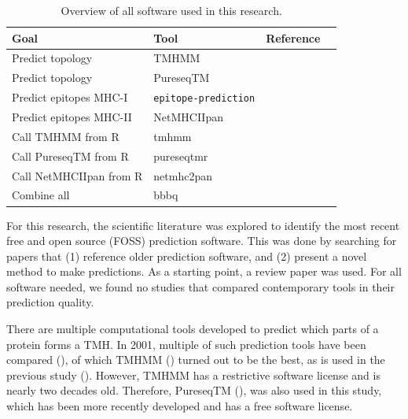 \begin{table}[]
  \begin{tabular}{llll}
    Goal & Tool & Reference \\ 
    \hline
    Predict topology                  & TMHMM                     & \cite{krogh2001predicting} \\
    Predict topology                  & PureseqTM                 & \cite{wang2019efficient} \\
    Predict epitopes MHC-I            & \verb;epitope-prediction; & \cite{bianchi2017} \\
    Predict epitopes MHC-II           & NetMHCIIpan               & \cite{nielsen2008quantitative,karosiene2013netmhciipan} \\
    Call TMHMM from R                 & tmhmm                     & \cite{tmhmm} \\
    Call PureseqTM from R             & pureseqtmr                & \cite{pureseqtmr} \\
    Call NetMHCIIpan from R           & netmhc2pan                & \cite{netmhc2pan} \\
    Combine all                       & bbbq                      & \cite{bbbq}
  \end{tabular}
  \caption{
    Overview of all software used in this research.
  }
  \label{table:software_used}
\end{table}

For this research, the scientific literature was explored 
to identify the most recent free and open source (FOSS) prediction software.
This was done by searching for papers that (1) reference older
prediction software, and (2) present a novel method to make predictions.
As a starting point, a review paper was used.
For all software needed, we found no studies that compared contemporary tools 
in their prediction quality.


There are multiple computational tools developed to predict which
parts of a protein forms a TMH.
In 2001, multiple of such prediction tools have been compared (\cite{moller2001evaluation}),
of which TMHMM (\cite{krogh2001predicting}) turned out to be the best, 
as is used in the previous study (\cite{bianchi2017}).
However, TMHMM has a restrictive software license and is nearly two
decades old.
Therefore, PureseqTM (\cite{wang2019efficient}),
was also used in this study, which has been more recently developed
and has a free software license.

